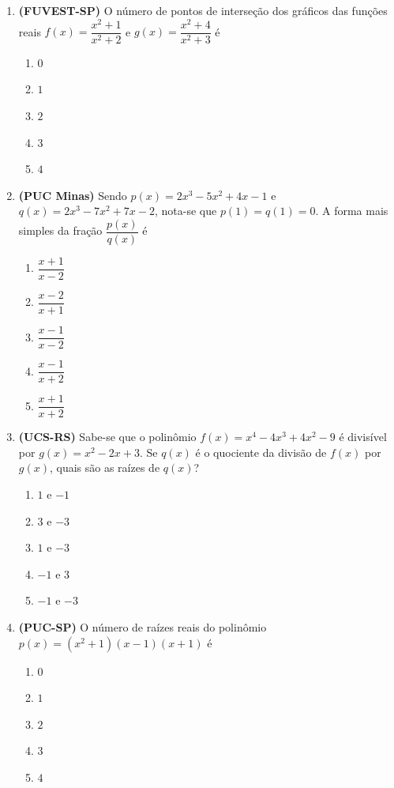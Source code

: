 \documentclass[12pt,a4paper]{article}
\begin{document}
\begin{enumerate}

    \item \textbf{(FUVEST-SP)} O número de pontos de interseção dos gráficos das funções reais $f(x) = \dfrac{x^2 + 1}{x^2 + 2}$ e $g(x) = \dfrac{x^2 + 4}{x^2 + 3}$ é
   
    \begin{enumerate}
        \item $0$
        \item $1$
        \item $2$
        \item $3$
        \item $4$
    \end{enumerate}

    \item \textbf{(PUC Minas)} Sendo $p(x) = 2x^3 - 5x^2 + 4x - 1$ e $q(x) = 2x^3 - 7x^2 + 7x - 2$, nota-se que $p(1) = q(1) = 0$. A forma mais simples da fração $\dfrac{p(x)}{q(x)}$ é
    \begin{enumerate}
        \item $\dfrac{x + 1}{x - 2}$
        \item $\dfrac{x - 2}{x + 1}$
        \item $\dfrac{x - 1}{x - 2}$
        \item $\dfrac{x - 1}{x + 2}$
        \item $\dfrac{x + 1}{x + 2}$
    \end{enumerate}

    \vspace{0.3cm}

    \item \textbf{(UCS-RS)} Sabe-se que o polinômio $f(x) = x^4 - 4x^3 + 4x^2 - 9$ é divisível por $g(x) = x^2 - 2x + 3$. Se $q(x)$ é o quociente da divisão de $f(x)$ por $g(x)$, quais são as raízes de $q(x)$?
    \begin{enumerate}
        \item $1$ e $-1$
        \item $3$ e $-3$
        \item $1$ e $-3$
        \item $-1$ e $3$
        \item $-1$ e $-3$
    \end{enumerate}

    \vspace{0.3cm}

    \item \textbf{(PUC-SP)} O número de raízes reais do polinômio $p(x) = (x^2 + 1)(x - 1)(x + 1)$ é
    \begin{enumerate}
        \item $0$
        \item $1$
        \item $2$
        \item $3$
        \item $4$
    \end{enumerate}


\end{enumerate}
\end{document}
